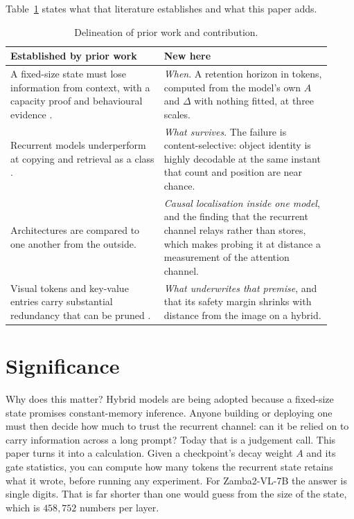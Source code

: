 \documentclass{article}
\begin{document}
Table~\ref{tab:novelty} states what that literature establishes and what this
paper adds.

\begin{table}[h]
\centering\small
\begin{tabular}{p{0.44\linewidth}p{0.48\linewidth}}
\toprule
\textbf{Established by prior work} & \textbf{New here} \\
\midrule
A fixed-size state must lose information from context, with a capacity proof
and behavioural evidence \cite{jelassi2024copying,merrill2024illusion,wen2024rnns}.
& \emph{When}. A retention horizon in tokens, computed from the model's own
$A$ and $\Delta$ with nothing fitted, at three scales. \\
\addlinespace
Recurrent models underperform at copying and retrieval as a class
\cite{arora2023zoology,arora2024based}.
& \emph{What survives}. The failure is content-selective: object identity is
highly decodable at the same instant that count and position are near chance. \\
\addlinespace
Architectures are compared to one another from the outside.
& \emph{Causal localisation inside one model}, and the finding that the
recurrent channel relays rather than stores, which makes probing it at distance
a measurement of the attention channel. \\
\addlinespace
Visual tokens and key-value entries carry substantial redundancy that can be
pruned \cite{chen2024fastv,yang2024visionzip,shang2025prumerge}.
& \emph{What underwrites that premise}, and that its safety margin shrinks
with distance from the image on a hybrid. \\
\bottomrule
\end{tabular}
\caption{Delineation of prior work and contribution.}
\label{tab:novelty}
\end{table}

\section{Significance}

Why does this matter? Hybrid models are being adopted because a fixed-size
state promises constant-memory inference. Anyone building or deploying one
must then decide how much to trust the recurrent channel: can it be relied on
to carry information across a long prompt? Today that is a judgement call.
This paper turns it into a calculation. Given a checkpoint's decay weight $A$
and its gate statistics, you can compute how many tokens the recurrent state
retains what it wrote, before running any experiment. For Zamba2-VL-7B the
answer is single digits. That is far shorter than one would guess from the
size of the state, which is $458{,}752$ numbers per layer.
\end{document}

